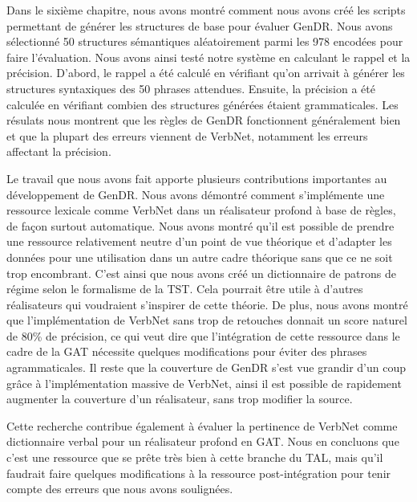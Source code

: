 Dans le sixième chapitre, nous avons montré comment nous avons créé les scripts permettant de générer les structures de base pour évaluer GenDR. Nous avons sélectionné 50 structures sémantiques aléatoirement parmi les 978 encodées pour faire l'évaluation. Nous avons ainsi testé notre système en calculant le rappel et la précision. D'abord, le rappel a été calculé en vérifiant qu'on arrivait à générer les structures syntaxiques des 50 phrases attendues. Ensuite, la précision a été calculée en vérifiant combien des structures générées étaient grammaticales. Les résulats nous montrent que les règles de GenDR fonctionnent généralement bien et que la plupart des erreurs viennent de VerbNet, notamment les erreurs affectant la précision.

Le travail que nous avons fait apporte plusieurs contributions importantes au développement de GenDR. Nous avons démontré comment s'implémente une ressource lexicale comme VerbNet dans un réalisateur profond à base de règles, de façon surtout automatique. Nous avons montré qu'il est possible de prendre une ressource relativement neutre d'un point de vue théorique et d'adapter les données pour une utilisation dans un autre cadre théorique sans que ce ne soit trop encombrant. C'est ainsi que nous avons créé un dictionnaire de patrons de régime selon le formalisme de la \ac{TST}. Cela pourrait être utile à d'autres réalisateurs qui voudraient s'inspirer de cette théorie. De plus, nous avons montré que l'implémentation de VerbNet sans trop de retouches donnait un score naturel de 80\% de précision, ce qui veut dire que l'intégration de cette ressource dans le cadre de la \ac{GAT} nécessite quelques modifications pour éviter des phrases agrammaticales. Il reste que la couverture de GenDR s'est vue grandir d'un coup grâce à l'implémentation massive de VerbNet, ainsi il est possible de rapidement augmenter la couverture d'un réalisateur, sans trop modifier la source. 

Cette recherche contribue également à évaluer la pertinence de VerbNet comme dictionnaire verbal pour un réalisateur profond en \ac{GAT}. Nous en concluons que c'est une ressource que se prête très bien à cette branche du \ac{TAL}, mais qu'il faudrait faire quelques modifications à la ressource post-intégration pour tenir compte des erreurs que nous avons soulignées.


